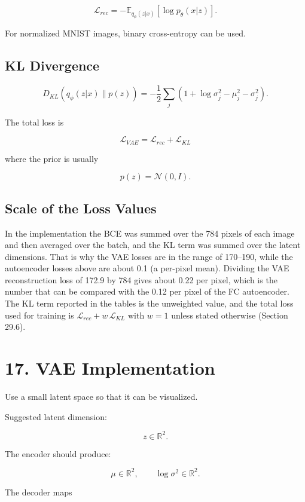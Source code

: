 \documentclass[10pt]{article}
\begin{document}
\[
\mathcal{L}_{rec}
=
-\mathbb{E}_{q_{\phi}(z|x)}
[\log p_{\theta}(x|z)].
\]

For normalized MNIST images, binary cross-entropy can be used.

\subsection*{KL Divergence}

\[
D_{KL}
\left(
q_{\phi}(z|x)\parallel p(z)
\right)
=
-\frac{1}{2}
\sum_j
\left(
1+\log\sigma_j^2-\mu_j^2-\sigma_j^2
\right).
\]

The total loss is

\[
\boxed{
\mathcal{L}_{VAE}
=
\mathcal{L}_{rec}
+
\mathcal{L}_{KL}
}
\]

where the prior is usually

\[
p(z)=\mathcal{N}(0,I).
\]

\subsection*{Scale of the Loss Values}

In the implementation the BCE was summed over the 784 pixels of each image
and then averaged over the batch, and the KL term was summed over the latent
dimensions. That is why the VAE losses are in the range of 170--190, while the
autoencoder losses above are about 0.1 (a per-pixel mean). Dividing the VAE
reconstruction loss of 172.9 by 784 gives about 0.22 per pixel, which is the
number that can be compared with the 0.12 per pixel of the FC autoencoder. The
KL term reported in the tables is the unweighted value, and the total loss used
for training is $\mathcal{L}_{rec}+w\,\mathcal{L}_{KL}$ with $w=1$ unless stated
otherwise (Section 29.6).

\section*{17. VAE Implementation}

Use a small latent space so that it can be visualized.

Suggested latent dimension:

\[
z\in\mathbb{R}^{2}.
\]

The encoder should produce:

\[
\mu\in\mathbb{R}^{2},
\qquad
\log\sigma^2\in\mathbb{R}^{2}.
\]

The decoder maps
\end{document}
